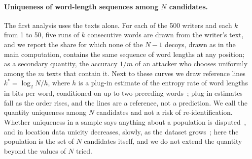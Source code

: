 \paragraph{Uniqueness of word-length sequences among $N$ candidates.}
The first analysis uses the texts alone. For each of the 500 writers and each $k$ from 1 to 50, five runs of $k$
consecutive words are drawn from the writer's text, and we report the share for which none of the $N - 1$ decoys,
drawn as in the main computation, contains the same sequence of word lengths at any position; as a secondary quantity,
the accuracy $1/m$ of an attacker who chooses uniformly among the $m$ texts that contain it. Next to these curves we
draw reference lines $k^{*} = \log_2 N / h$, where $h$ is a plug-in estimate of the entropy rate of word lengths in
bits per word, conditioned on up to two preceding words~\cite{kalimeri2012entropy}; plug-in estimates fall as the
order rises, and the lines are a reference, not a prediction. We call the quantity uniqueness among $N$ candidates and
not a risk of re-identification. Whether uniqueness in a sample says anything about a population is
disputed~\cite{sanchez2016comment,rocher2019estimating}, and in location data unicity decreases, slowly, as the dataset
grows~\cite{farzanehfar2021risk}; here the population is the set of $N$ candidates itself, and we do not extend the
quantity beyond the values of $N$ tried.

